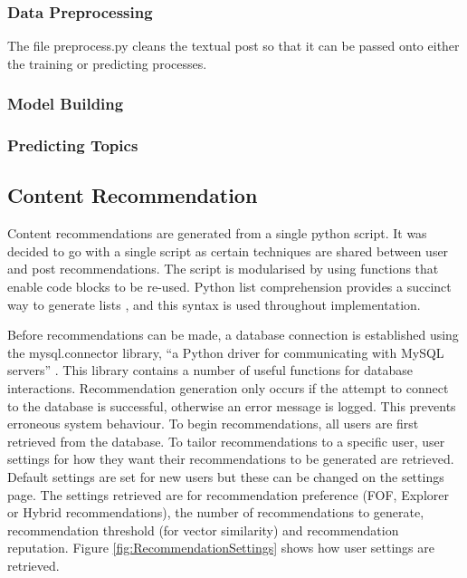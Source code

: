 \subsubsection{Data Preprocessing}
The file preprocess.py cleans the textual post so that it can be passed onto either the training or predicting processes.

\subsubsection{Model Building}

\subsubsection{Predicting Topics}

\subsection{Content Recommendation}
Content recommendations are generated from a single python script. It was decided to go with a single script as certain techniques are shared between user and post recommendations. The script is modularised by using functions that enable code blocks to be re-used. Python list comprehension provides a succinct way to generate lists \cite{Python:ListComprehension}, and this syntax is used throughout implementation.

Before recommendations can be made, a database connection is established using the mysql.connector library, ``a Python driver for communicating with MySQL servers'' \cite{MySQL:MySQLConnector}. This library contains a number of useful functions for database interactions. Recommendation generation only occurs if the attempt to connect to the database is successful, otherwise an error message is logged. This prevents erroneous system behaviour. To begin recommendations, all users are first retrieved from the database. To tailor recommendations to a specific user, user settings for how they want their recommendations to be generated are retrieved. Default settings are set for new users but these can be changed on the settings page. The settings retrieved are for recommendation preference (FOF, Explorer or Hybrid recommendations), the number of recommendations to generate, recommendation threshold (for vector similarity) and recommendation reputation. Figure \ref{fig:RecommendationSettings} shows how user settings are retrieved.


